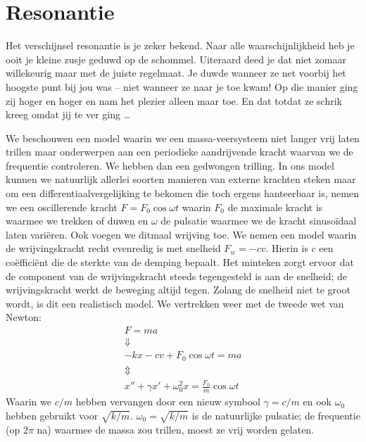 \newpage

\section{Resonantie}


Het verschijnsel resonantie is je zeker bekend. Naar alle waarschijnlijkheid heb je ooit je kleine zusje geduwd op de schommel. Uiteraard deed je dat niet zomaar willekeurig maar met de juiste regelmaat. Je duwde wanneer ze net voorbij het hoogste punt bij jou was -- niet wanneer ze naar je toe kwam! Op die manier ging zij hoger en hoger en nam het plezier alleen maar toe. En dat totdat ze schrik kreeg omdat jij te ver ging \ldots

We beschouwen een model waarin we een massa-veersysteem niet langer vrij laten trillen maar onderwerpen aan een periodieke aandrijvende kracht waarvan we de frequentie controleren. We hebben dan een gedwongen trilling. In ons model kunnen we natuurlijk allerlei soorten manieren van externe krachten steken maar om een differentiaalvergelijking te bekomen die toch ergens hanteerbaar is, nemen we een oscillerende kracht $F=F_0\cos\omega t$ waarin $F_0$ de maximale kracht is waarmee we trekken of duwen en $\omega$ de pulsatie waarmee we de kracht sinuso\"idaal laten vari\"eren. Ook voegen we ditmaal wrijving toe. We nemen een model waarin de wrijvingskracht recht evenredig is met snelheid $F_w=-cv$. Hierin is $c$ een co\"effici\"ent die de sterkte van de demping bepaalt. Het minteken zorgt ervoor dat de component van de wrijvingskracht steeds tegengesteld is aan de snelheid; de wrijvingskracht werkt de beweging altijd tegen. Zolang de snelheid niet te groot wordt, is dit een realistisch model. We vertrekken weer met de tweede wet van Newton:
\begin{gather}
F=ma\nonumber\\
\Downarrow\nonumber\\
-kx-cv+F_0\cos\omega t=ma\nonumber\\
\Updownarrow\nonumber\\
x''+\gamma x'+\omega_0^2x=\frac{F_0}{m}\cos\omega t\label{diffvgl_resonantie}
\end{gather}
Waarin we $c/m$ hebben vervangen door een nieuw symbool $\gamma=c/m$ en ook $\omega_0$ hebben gebruikt voor $\sqrt{k/m}$. $\omega_0=\sqrt{k/m}$ is de natuurlijke pulsatie; de frequentie (op $2\pi$ na) waarmee de massa zou trillen, moest ze vrij worden gelaten.

